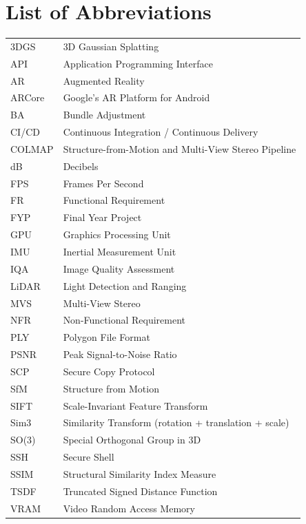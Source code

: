 \chapter*{List of Abbreviations}

\begin{tabular}{ll}
3DGS & 3D Gaussian Splatting \\
API & Application Programming Interface \\
AR & Augmented Reality \\
ARCore & Google's AR Platform for Android \\
BA & Bundle Adjustment \\
CI/CD & Continuous Integration / Continuous Delivery \\
COLMAP & Structure-from-Motion and Multi-View Stereo Pipeline \\
dB & Decibels \\
FPS & Frames Per Second \\
FR & Functional Requirement \\
FYP & Final Year Project \\
GPU & Graphics Processing Unit \\
IMU & Inertial Measurement Unit \\
IQA & Image Quality Assessment \\
LiDAR & Light Detection and Ranging \\
MVS & Multi-View Stereo \\
NFR & Non-Functional Requirement \\
PLY & Polygon File Format \\
PSNR & Peak Signal-to-Noise Ratio \\
SCP & Secure Copy Protocol \\
SfM & Structure from Motion \\
SIFT & Scale-Invariant Feature Transform \\
Sim3 & Similarity Transform (rotation + translation + scale) \\
SO(3) & Special Orthogonal Group in 3D \\
SSH & Secure Shell \\
SSIM & Structural Similarity Index Measure \\
TSDF & Truncated Signed Distance Function \\
VRAM & Video Random Access Memory \\
\end{tabular}
